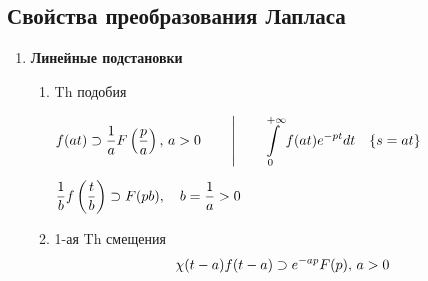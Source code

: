 	\subsection{Свойства преобразования Лапласа}
	\renewcommand{\labelenumi}{\fbox{ \large\Roman{enumi} }}
	\renewcommand{\labelenumii}{\arabic{enumii}.}
	\begin{enumerate}
		\item \textbf{Линейные подстановки}
			 \begin{enumerate}
			 	\item Th подобия \vspace{4mm} \newline
			 		\begin{minipage}{0.4\textwidth}	
			 			$
			 				\begin{gathered}
		 						f(at) \lftKul \dfrac{1}{a}F\left(\dfrac{p}{a}\right),\,  a>0  \qquad \vspace{3mm} \left| 
		 						 \qquad \int\limits_{0}^{+\infty} f(at) e^{-pt}dt  \quad \{s=at\}
		 						\vspace{3mm}\right.
		 					\end{gathered}
						$
						$
							\dfrac{1}{b} f\left(\dfrac{t}{b}\right) \supset F(pb), \quad b = \dfrac{1}{a}> 0
						$
			 		\end{minipage} \vspace{5mm}
			 	\item 1-ая Th смещения \vspace{1mm} \newline
			 		$$
			 			\chi(t-a)f(t-a)  \supset e^{-ap}F(p),\,  a>0
			 		$$
			 		

\end{enumerate}
\end{enumerate}
